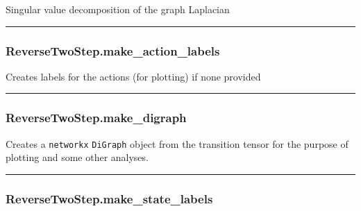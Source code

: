 \begin{Shaded}
\begin{Highlighting}[]
\NormalTok{)}
\end{Highlighting}
\end{Shaded}

Singular value decomposition of the graph Laplacian

\begin{center}\rule{0.5\linewidth}{\linethickness}\end{center}

\subsubsection{ReverseTwoStep.make\_action\_labels}\label{reversetwostep.make_action_labels}

\begin{Shaded}
\begin{Highlighting}[]
\NormalTok{)}
\end{Highlighting}
\end{Shaded}

Creates labels for the actions (for plotting) if none provided

\begin{center}\rule{0.5\linewidth}{\linethickness}\end{center}

\subsubsection{ReverseTwoStep.make\_digraph}\label{reversetwostep.make_digraph}

\begin{Shaded}
\begin{Highlighting}[]
\NormalTok{)}
\end{Highlighting}
\end{Shaded}

Creates a \texttt{networkx} \texttt{DiGraph} object from the transition
tensor for the purpose of plotting and some other analyses.

\begin{center}\rule{0.5\linewidth}{\linethickness}\end{center}

\subsubsection{ReverseTwoStep.make\_state\_labels}\label{reversetwostep.make_state_labels}

